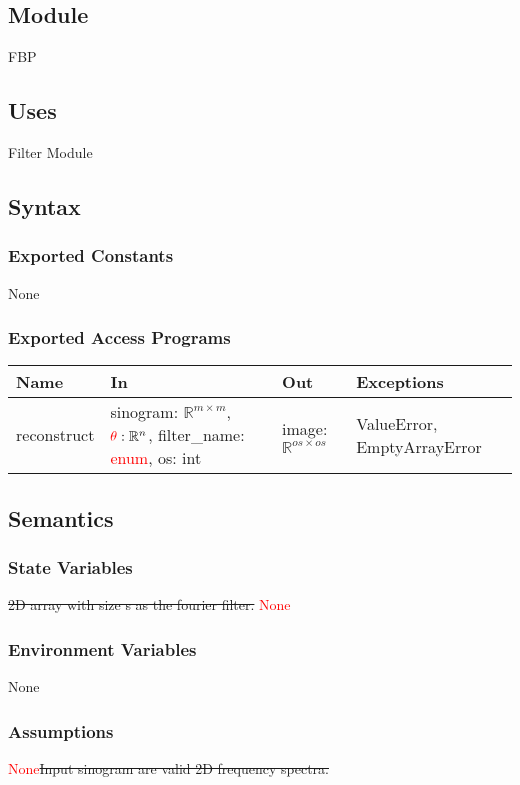 \documentclass[12pt, titlepage]{article}
\newcommand{\add}{\textcolor{red}}
\begin{document}
\subsection{Module}
FBP

\subsection{Uses}
Filter Module

\subsection{Syntax}

\subsubsection{Exported Constants}
None

\subsubsection{Exported Access Programs}

\begin{center}
  \begin{tabular}{|l|m{18em}|l|m{11em}|}
\hline
\textbf{Name} & \textbf{In} & \textbf{Out} & \textbf{Exceptions} \\
\hline
reconstruct & sinogram: \(\mathbb{R}^{m \times m}\), \(\add{\theta}: \mathbb{R}^{n}\), filter\_name: \add{enum}, os: int & image: \(\mathbb{R}^{os \times os}\)& ValueError, EmptyArrayError\\
\hline
\end{tabular}
\end{center}

\subsection{Semantics}

\subsubsection{State Variables}
\st{2D array with size s as the fourier filter.} \add{None}

\subsubsection{Environment Variables}
None

\subsubsection{Assumptions}
\add{None}\st{Input sinogram are valid 2D frequency spectra.}
\end{document}

